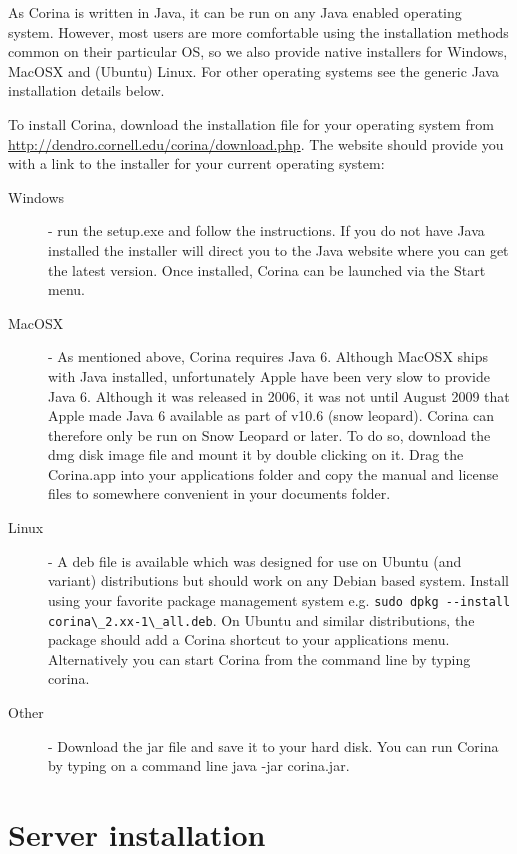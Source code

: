 \documentclass[10pt,letter, twopage headsepline]{book}
\begin{document}
As Corina is written in Java, it can be run on any Java enabled operating system. However, most users are more comfortable using the installation methods common on their particular OS, so we also provide native installers for Windows, MacOSX and (Ubuntu) Linux. For other operating systems see the generic Java installation details below.

To install Corina, download the installation file for your operating system from \url{http://dendro.cornell.edu/corina/download.php}. The website should provide you with a link to the installer for your current operating system:

\begin{description}
\item[Windows]- run the setup.exe and follow the instructions. If you do not have Java installed the installer will direct you to the Java website where you can get the latest version. Once installed, Corina can be launched via the Start menu.
\item[MacOSX] - As mentioned above, Corina requires Java 6. Although MacOSX ships with Java installed, unfortunately Apple have been very slow to provide Java 6. Although it was released in 2006, it was not until August 2009 that Apple made Java 6 available as part of v10.6 (snow leopard). Corina can therefore only be run on Snow Leopard or later. To do so, download the dmg disk image file and mount it by double clicking on it. Drag the Corina.app into your applications folder and copy the manual and license files to somewhere convenient in your documents folder.
\item[Linux] -  A deb file is available which was designed for use on Ubuntu (and variant) distributions but should work on any Debian based system. Install using your favorite package management system e.g. \verb|sudo dpkg --install corina\_2.xx-1\_all.deb|. On Ubuntu and similar distributions, the package should add a Corina shortcut to your applications menu. Alternatively you can start Corina from the command line by typing corina.
\item[Other] - Download the jar file and save it to your hard disk. You can run Corina by typing on a command line java -jar corina.jar.
\end{description}



\chapter{Server installation}
\end{document}
